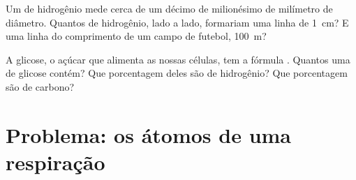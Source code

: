 \begin{exercise}[$\star\star\star$]\label{exo:g7:atoms-and-molecules:11}
Um  de hidrogênio mede cerca de um décimo de milionésimo de
milímetro de diâmetro. Quantos  de hidrogênio, lado a lado,
formariam uma linha de \qty{1}{cm}? E uma linha do comprimento de um
campo de futebol, \qty{100}{m}?
\end{exercise}

\begin{exercise}[$\star\star\star$]\label{exo:g7:atoms-and-molecules:12}
A glicose, o açúcar que alimenta as nossas células, tem a fórmula
. Quantos  uma  de glicose contém? Que
porcentagem deles são  de hidrogênio? Que porcentagem são 
de carbono?
\end{exercise}

\section{Problema: os átomos de uma respiração}

